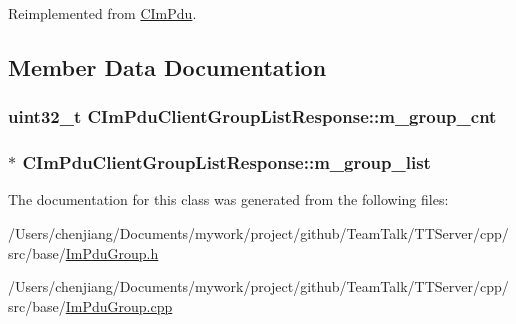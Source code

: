 Reimplemented from \hyperlink{class_c_im_pdu_a887912f445b3e864d33f9e7f2325f1fc}{C\+Im\+Pdu}.



\subsection{Member Data Documentation}
\hypertarget{class_c_im_pdu_client_group_list_response_ab12d56d89829c20ec6b49fde52d07183}{}
\subsubsection[{m\+\_\+group\+\_\+cnt}]{\setlength{\rightskip}{0pt plus 5cm}uint32\+\_\+t C\+Im\+Pdu\+Client\+Group\+List\+Response\+::m\+\_\+group\+\_\+cnt\hspace{0.3cm}{\ttfamily [private]}}\label{class_c_im_pdu_client_group_list_response_ab12d56d89829c20ec6b49fde52d07183}
\hypertarget{class_c_im_pdu_client_group_list_response_a75957a044b1f753da93a6b2b7ca0158a}{}
\subsubsection[{m\+\_\+group\+\_\+list}]{$\ast$ C\+Im\+Pdu\+Client\+Group\+List\+Response\+::m\+\_\+group\+\_\+list\hspace{0.3cm}{\ttfamily [private]}}\label{class_c_im_pdu_client_group_list_response_a75957a044b1f753da93a6b2b7ca0158a}


The documentation for this class was generated from the following files\+:\begin{DoxyCompactItemize}
\item 
/\+Users/chenjiang/\+Documents/mywork/project/github/\+Team\+Talk/\+T\+T\+Server/cpp/src/base/\hyperlink{_im_pdu_group_8h}{Im\+Pdu\+Group.\+h}\item 
/\+Users/chenjiang/\+Documents/mywork/project/github/\+Team\+Talk/\+T\+T\+Server/cpp/src/base/\hyperlink{_im_pdu_group_8cpp}{Im\+Pdu\+Group.\+cpp}\end{DoxyCompactItemize}
